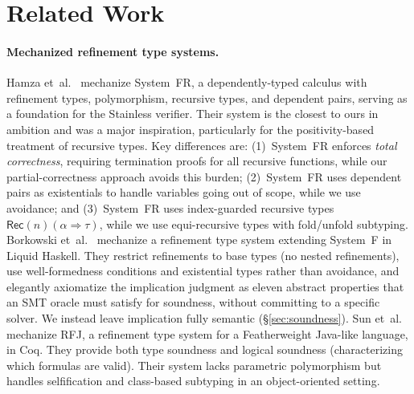 \documentclass[acmsmall]{acmart}
\begin{document}
\section{Related Work}\label{sec:related-work}

\paragraph{Mechanized refinement type systems.}
Hamza et~al.~\cite{hamza2019} mechanize System~FR, a dependently-typed calculus with refinement types, polymorphism, recursive types, and dependent pairs, serving as a foundation for the Stainless verifier. Their system is the closest to ours in ambition and was a major inspiration, particularly for the positivity-based treatment of recursive types. Key differences are: (1)~System~FR enforces \emph{total correctness}, requiring termination proofs for all recursive functions, while our partial-correctness approach avoids this burden; (2)~System~FR uses dependent pairs as existentials to handle variables going out of scope, while we use avoidance; and (3)~System~FR uses index-guarded recursive types $\textsf{Rec}(n)(\alpha \Rightarrow \tau)$, while we use equi-recursive types with fold/unfold subtyping.
%
Borkowski et~al.~\cite{borkowski2022} mechanize a refinement type system extending System~F in Liquid Haskell. They restrict refinements to base types (no nested refinements), use well-formedness conditions and existential types rather than avoidance, and elegantly axiomatize the implication judgment as eleven abstract properties that an SMT oracle must satisfy for soundness, without committing to a specific solver. We instead leave implication fully semantic (\S\ref{sec:soundness}).
%
Sun et~al.~\cite{sun2024} mechanize RFJ, a refinement type system for a Featherweight Java-like language, in Coq. They provide both type soundness and logical soundness (characterizing which formulas are valid). Their system lacks parametric polymorphism but handles selfification and class-based subtyping in an object-oriented setting.
\end{document}
